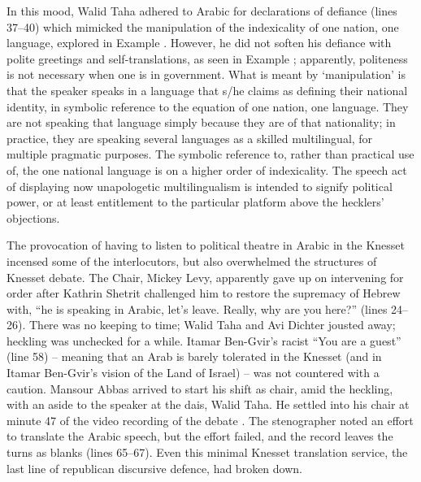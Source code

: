 \documentclass[output=paper,arabicfont]{langscibook}
\begin{document}
In this mood, Walid Taha adhered to Arabic for declarations of defiance (lines 37–40) which mimicked the manipulation of the indexicality of one nation, one language, explored in Example . However, he did not soften his defiance with polite greetings and self-translations, as seen in Example ; apparently, politeness is not necessary when one is in government. What is meant by ‘manipulation' is that the speaker speaks in a language that s/he claims as defining their national identity, in symbolic reference to the equation of one nation, one language. They are not speaking that language simply because they are of that nationality; in practice, they are speaking several languages as a skilled multilingual, for multiple pragmatic purposes. The symbolic reference to, rather than practical use of, the one national language is on a higher order of indexicality. The speech act of displaying now unapologetic multilingualism is intended to signify political power, or at least entitlement to the particular platform above the hecklers’ objections. 

The provocation of having to listen to political theatre in Arabic in the Knesset incensed some of the interlocutors, but also overwhelmed the structures of Knesset debate. The Chair, Mickey Levy, apparently gave up on intervening for order after Kathrin Shetrit challenged him to restore the supremacy of Hebrew with, “he is speaking in Arabic, let’s leave. Really, why are you here?” (lines 24–26). There was no keeping to time; Walid Taha and Avi Dichter jousted away; heckling was unchecked for a while. Itamar Ben-Gvir’s racist “You are a guest” (line 58) – meaning that an Arab is barely tolerated in the Knesset (and in Itamar Ben-Gvir’s vision of the Land of Israel) – was not countered with a caution. Mansour Abbas arrived to start his shift as chair, amid the heckling, with an aside to the speaker at the dais, Walid Taha. He settled into his chair at minute 47 of the video recording of the debate \citep{knesset2022-c}. The stenographer noted an effort to translate the Arabic speech, but the effort failed, and the record leaves the turns as blanks (lines 65–67). Even this minimal Knesset translation service, the last line of republican discursive defence, had broken down.
\end{document}
